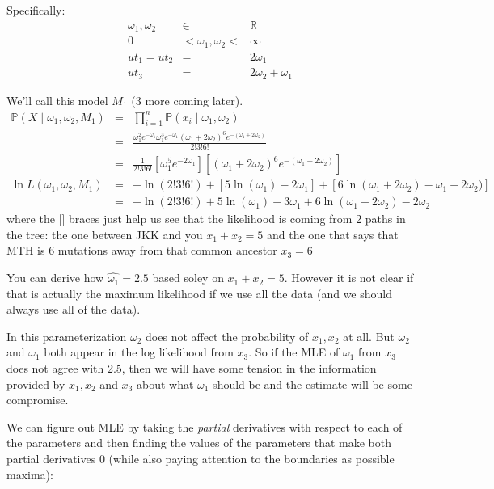 \documentclass[11pt]{article}
\renewcommand{\Pr}{\mathbb{P}}
\begin{document}
Specifically:
\begin{eqnarray}
    \omega_1, \omega_2 & \in &  \mathbb{R}\\
    0 & < \omega_1, \omega_2 < & \infty\\
     ut_1 = ut_2 & = & 2\omega_1  \\
    ut_3 &= & 2\omega_2 + \omega_1
\end{eqnarray}

We'll call this model $M_1$ (3 more coming later).
\begin{eqnarray}
\Pr(X\mid \omega_1,\omega_2, M_1)& = & \prod_{i=1}^{n} \Pr(x_i\mid \omega_1,\omega_2)\\
& = &
 \frac{\omega_1^2e^{-\omega_1}\omega_1^3e^{-\omega_1}\left(\omega_1+2\omega_2\right)^6e^{-(\omega_1+2\omega_2)}}{2!3!6!} \\
& = & \frac{1}{2!3!6!}\left[\omega_1^5e^{-2\omega_1}\right]
\left[\left(\omega_1+2\omega_2\right)^6e^{-(\omega_1+2\omega_2)}\right] \\
\ln L(\omega_1,\omega_2, M_1) & = & -\ln(2!3!6!)+ \left[5 \ln(\omega_1) -2\omega_1\right] +
\left[6\ln\left(\omega_1+2\omega_2\right) -\omega_1- 2\omega_2)\right] \\
& = & -\ln(2!3!6!)+ 5 \ln(\omega_1) -3\omega_1 +
6\ln\left(\omega_1+2\omega_2\right) - 2\omega_2
\end{eqnarray}
where the [] braces just help us see that the likelihood is coming from 2 paths in the tree: the one between JKK and you $x_1+x_2 = 5$ and the one that says that MTH
is 6 mutations away from that common ancestor $x_3 = 6$

You can derive how $\hat{\omega_1}=2.5$ based soley on $x_1+x_2 = 5$.
However it is not clear if that is actually the maximum likelihood
if we use all the data (and we should always use all of the data).

In this parameterization $\omega_2$ does not affect the probability of $x_1, x_2$ at 
all. 
But $\omega_2$ and $\omega_1$ both appear in the log likelihood from $x_3$.
So if the MLE of $\omega_1$ from $x_3$ does not agree with 2.5, then we 
    will have some tension in the information provided by $x_1, x_2$
    and $x_3$ about what $\omega_1$ should be and the estimate will be 
    some compromise.

We can figure out MLE by taking the {\em partial} derivatives with
    respect to each of the parameters and then
    finding the values of the parameters that make
    both partial derivatives 0 (while also paying attention to
    the boundaries as possible maxima):
\end{document}

